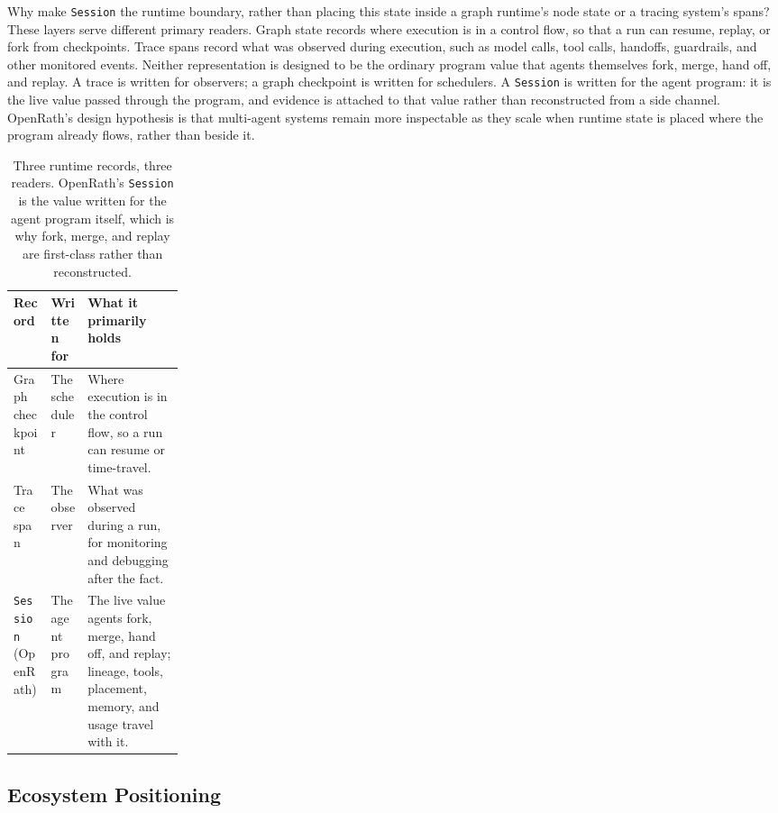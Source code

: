 \documentclass{llmxive}
\begin{document}
Why make \texttt{Session} the runtime boundary, rather than placing this state inside a graph runtime's node state or a tracing system's spans? These layers serve different primary readers. Graph state records where execution is in a control flow, so that a run can resume, replay, or fork from checkpoints. Trace spans record what was observed during execution, such as model calls, tool calls, handoffs, guardrails, and other monitored events. Neither representation is designed to be the ordinary program value that agents themselves fork, merge, hand off, and replay. A trace is written for observers; a graph checkpoint is written for schedulers. A \texttt{Session} is written for the agent program: it is the live value passed through the program, and evidence is attached to that value rather than reconstructed from a side channel. OpenRath's design hypothesis is that multi-agent systems remain more inspectable as they scale when runtime state is placed where the program already flows, rather than beside it.

\begin{table}[!htbp] \vspace{0.1em} \centering \small
 \begin{tabularx}{\linewidth}{@{}>{\arraybackslash}p{0.22\linewidth}>{\arraybackslash}X>{\arraybackslash}X@{}} \toprule Record & Written for & What it primarily holds \\ \midrule Graph checkpoint & The scheduler & Where execution is in the control flow, so a run can resume or time-travel. \\ Trace span & The observer & What was observed during a run, for monitoring and debugging after the fact. \\ \texttt{Session} (OpenRath) & The agent program & The live value agents fork, merge, hand off, and replay; lineage, tools, placement, memory, and usage travel with it. \\ \bottomrule \end{tabularx} \vspace{0.1em} 
\caption{Three runtime records, three readers. OpenRath's \texttt{Session} is the value written for the agent program itself, which is why fork, merge, and replay are first-class rather than reconstructed.}
\label{tab:session-vs-others}
\end{table}

\subsection{Ecosystem Positioning}
\end{document}

